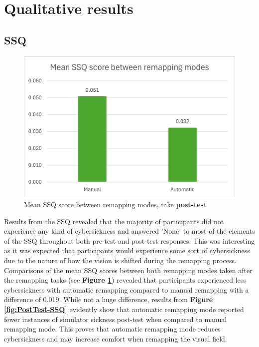 \documentclass{l4proj}
\begin{document}
\section{Qualitative results}

\subsection{SSQ}
\begin{figure}[!h]
    \centering
    \includegraphics[width=0.7\linewidth]{images/mean-SSQ.png}
    \caption{Mean SSQ score between remapping modes, take \textbf{post-test}}
    \label{fig:SSQ}
\end{figure}

Results from the SSQ revealed that the majority of participants did not experience any kind of cybersickness and answered 'None' to most of the elements of the SSQ throughout both pre-test and post-test responses. This was interesting as it was expected that participants would experience some sort of cybersickness due to the nature of how the vision is shifted during the remapping process. Comparisons of the mean SSQ scores between both remapping modes taken after the remapping tasks (see \textbf{Figure \ref{fig:SSQ}}) revealed that participants experienced less cybersickness with automatic remapping compared to manual remapping with a difference of 0.019. While not a huge difference, results from \textbf{Figure \ref{fig:PostTest-SSQ}} evidently show that automatic remapping mode reported fewer instances of simulator sickness post-test when compared to manual remapping mode. This proves that automatic remapping mode reduces cybersickness and may increase comfort when remapping the visual field.
\end{document}

